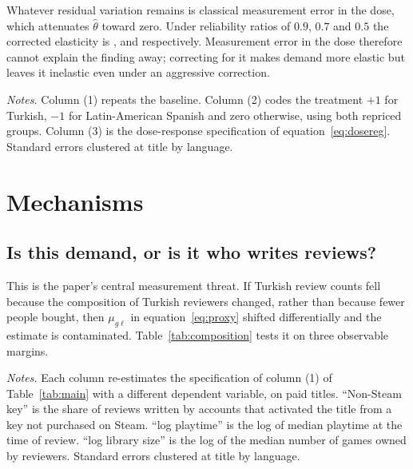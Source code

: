 \documentclass[11pt]{article}
\newcommand{\notes}[1]{%
  \par\vspace{4pt}\noindent
  \begin{minipage}{\linewidth}\setstretch{1.02}\footnotesize
  \textit{Notes.} #1\end{minipage}}
\begin{document}
Whatever residual variation remains is classical measurement error in the dose, which attenuates
$\hat\theta$ toward zero. Under reliability ratios of $0.9$, $0.7$ and $0.5$ the corrected
elasticity is \thetaAttNine, \thetaAttSeven{} and \thetaAttFive{} respectively. Measurement error
in the dose therefore cannot explain the finding away; correcting for it makes demand more elastic
but leaves it inelastic even under an aggressive correction.

\begin{table}[htbp]
\centering
\caption{Extensions: two treated clusters and the dose}\label{tab:extensions}
\vspace{2pt}
{\footnotesize}
\notes{Column (1) repeats the baseline. Column (2) codes the treatment $+1$ for Turkish, $-1$ for
Latin-American Spanish and zero otherwise, using both repriced groups. Column (3) is the
dose-response specification of equation~\eqref{eq:dosereg}. Standard errors clustered at title by
language.}
\end{table}

\section{Mechanisms}\label{sec:mech}

\subsection{Is this demand, or is it who writes reviews?}

This is the paper's central measurement threat. If Turkish review counts fell because the
composition of Turkish reviewers changed, rather than because fewer people bought, then
$\mu_{g\ell}$ in equation~\eqref{eq:proxy} shifted differentially and the estimate is contaminated.
Table~\ref{tab:composition} tests it on three observable margins.

\begin{table}[htbp]
\centering
\caption{Reviewer composition and the substitution margin}\label{tab:composition}
\vspace{2pt}
{\footnotesize}
\notes{Each column re-estimates the specification of column (1) of Table~\ref{tab:main} with a
different dependent variable, on paid titles. ``Non-Steam key'' is the share of reviews written by
accounts that activated the title from a key not purchased on Steam. ``log playtime'' is the log of
median playtime at the time of review. ``log library size'' is the log of the median number of games
owned by reviewers. Standard errors clustered at title by language.}
\end{table}
\end{document}
